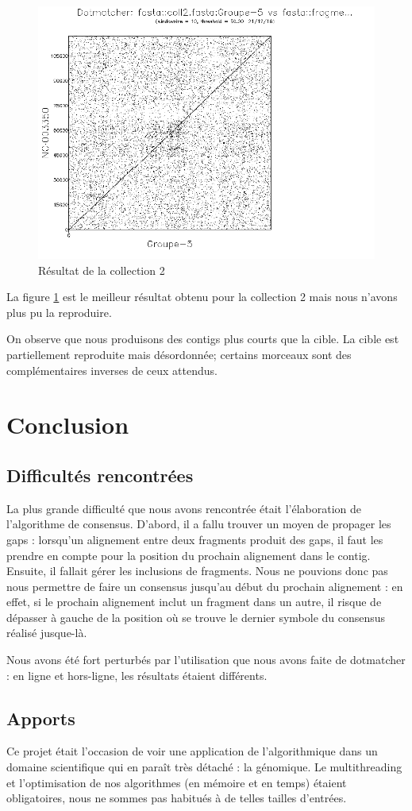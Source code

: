 \documentclass[a4paper, 12pt, titlepage]{article}
\begin{document}
\begin{figure}
 \centering
 \includegraphics[scale=0.4]{figures/dotmatcherc2.png}
 \caption{Résultat de la collection 2}
 \label{dm2}
\end{figure}
La figure \ref{dm2} est le meilleur résultat obtenu pour la collection 2
mais nous n'avons plus pu la reproduire.

On observe que nous produisons des contigs plus courts que la cible.
La cible est partiellement reproduite mais désordonnée;
certains morceaux sont des complémentaires inverses de ceux attendus.

\newpage
\section{Conclusion}
\subsection{Difficultés rencontrées}
La plus grande difficulté que nous avons rencontrée était l'élaboration de
l'algorithme de consensus.
D'abord, il a fallu trouver un moyen de propager les gaps :
lorsqu'un alignement entre deux fragments produit des gaps, il faut
les prendre en compte pour la position du prochain alignement dans le contig.
Ensuite, il fallait gérer les inclusions de fragments.
Nous ne pouvions donc pas nous permettre de faire un consensus
jusqu'au début du prochain alignement :
en effet, si le prochain alignement inclut un fragment dans un autre, il risque
de dépasser à gauche de la position où se trouve le dernier symbole du
consensus réalisé jusque-là.

Nous avons été fort perturbés par l'utilisation que nous avons faite
de dotmatcher : en ligne et hors-ligne, les résultats étaient différents.

\subsection{Apports}
Ce projet était l'occasion de voir une application de l'algorithmique dans un
domaine scientifique qui en paraît très détaché : la génomique.
Le multithreading et l'optimisation de nos algorithmes (en mémoire et en temps)
étaient obligatoires, nous ne sommes pas habitués à de telles tailles d'entrées.
\end{document}
